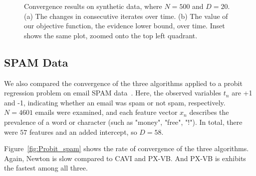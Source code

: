 \documentclass{article}
\begin{document}
\begin{figure}[tb]
\begin{subfigure}[t]{0.49\textwidth}
        \subcaption{}
    \end{subfigure}
    \caption{Convergence results on synthetic data, where $N = 500$ and $D = 20$. (a) The changes in consecutive iterates over time.  (b) The value of our objective function, the evidence lower bound, over time. Inset shows the same plot, zoomed onto the top left quadrant.}
    \label{fig:Probit_synth}
\end{figure}



\subsection{SPAM Data}
We also compared the convergence of the three algorithms applied to a probit regression problem on email SPAM data~\cite{Efron}. Here, the observed variables $t_n$ are +1 and -1, indicating whether an email was spam or not spam, respectively. $N=4601$ emails were examined, and each feature vector $x_n$ describes the prevalence of a word or character (such as "money", "free", "!"). In total, there were $57$ features and an added intercept, so $D = 58$. 

Figure~\ref{fig:Probit_spam} shows the rate of convergence of the three algorithms.  Again, Newton is slow compared to CAVI and PX-VB. And PX-VB is exhibits the fastest among all three. 
\end{document}

